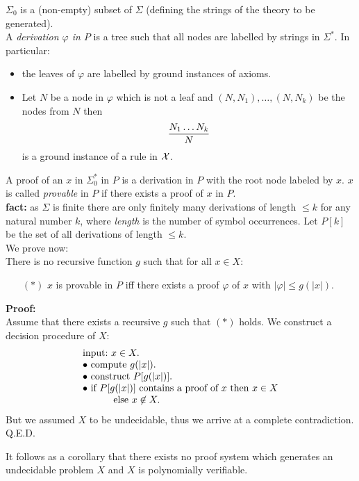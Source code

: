 \documentclass[12pt]{article}
\begin{document}
$\Sigma_0$ is a (non-empty) subset of $\Sigma$ (defining the strings of the
theory to be generated).
\\[1ex]
%
A {\em derivation $\varphi$ in $P$} is a tree such that all nodes are labelled
by strings in $\Sigma^*$. In particular:
%
\begin{itemize}
\item the leaves of $\varphi$ are labelled by ground instances of axioms.
\item Let $N$ be a node in $\varphi$ which is not a leaf and
    $(N,N_1),\ldots,(N,N_k)$ be the nodes from $N$ then
\[
{N_1 \ldots N_k\over N}
\]
%
is a ground instance of a rule in ${\cal X}$.
\end{itemize}

A proof of an $x$ in $\Sigma_0^*$ in $P$ is a derivation in $P$
with the root node labeled
by $x$. $x$ is called {\em provable} in $P$ if there exists a proof of
$x$ in $P$.\\[1ex]
%
{\bf fact:} as $\Sigma$ is finite there are only finitely many derivations
of length $\leq k$ for any natural number $k$, where {\em length} is the
number of symbol occurrences. Let $P[k]$ be the set of all derivations of
length $\leq k$.\\[1ex]
%
We prove now:\\
There is no recursive function $g$ such that for all $x \in X$:
\begin{itemize}
\item[$(*)$] $x$ is provable in $P$ iff there exists a proof $\varphi$ of $x$
    with $|\varphi| \leq g(|x|)$.
\end{itemize}
%
{\bf Proof:}\\
Assume that there exists a recursive $g$ such that $(*)$ holds. We construct a
decision procedure of $X$:
%
\[
\begin{array}{l}
\mbox{input:}\ x \in X.\\
\bullet\ \mbox{compute}\ g(|x|).\\
\bullet\ \mbox{construct}\ P[g(|x|)].\\
\bullet\ \mbox{if } P[g(|x|)] \mbox{ contains a proof of }x \mbox{ then }
    x \in X\\
\hspace*{1cm} \mbox{ else } x \not \in X.
\end{array}
\]
%
But we assumed $X$ to be undecidable, thus we arrive at a complete contradiction. {Q.E.D.}

It follows as a corollary that there exists no proof system which generates an undecidable
problem $X$ and $X$ is polynomially verifiable.
\end{document}
